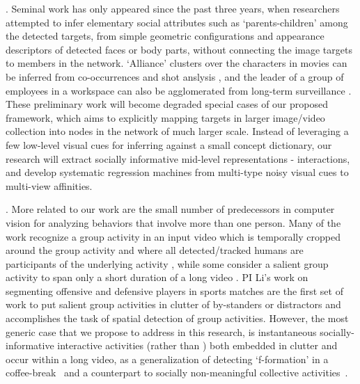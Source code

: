 . Seminal work has only appeared since the past three years, when researchers attempted to infer elementary social attributes such as `parents-children' among the detected targets, from simple geometric configurations and appearance descriptors of detected faces or body parts\cite{Gallagher,Wang2010,Murillo2012}, without connecting the image targets to members in the network. `Alliance' clusters over the characters in movies can be inferred from co-occurrences and shot anslysis \cite{Ding2010,Ding2011}, and the leader of a group of employees in a workspace can also be agglomerated from long-term surveillance \cite{Yu2009,Zhang2011}. These preliminary work will become degraded special cases of our proposed framework, which aims to explicitly mapping targets in larger image/video collection into nodes in the network of much larger scale. Instead of leveraging a few low-level visual cues for inferring against a small concept dictionary, our research will extract socially informative mid-level representations - interactions, and develop systematic regression machines from multi-type noisy visual cues to multi-view affinities.


. More related to our work are the small number of predecessors in computer vision for analyzing behaviors that involve more than one person. Many of the work recognize a group activity in an input video which is temporally cropped around the group activity and where all detected/tracked humans are participants of the underlying activity \cite{Intille:act,Ni:group,Lan:Group}, while some consider a salient group activity to span only a short duration of a long video \cite{Hongeng:act,Gong:act,Hakeem:act,Ba:meeting,McCowan:meeting,Choi:recogtrack,Vlad:group, Ryoo:group}. PI Li's work on segmenting offensive and defensive players in sports matches \cite{LiIJCV2012,Li2010} are the first set of work to put salient group activities in clutter of by-standers or distractors and accomplishes the task of spatial detection of group activities. However, the most generic case that we propose to address in this research, is instantaneous socially-informative interactive activities (rather than ) both embedded in clutter and occur within a long video, as a generalization of detecting `f-formation' in a coffee-break~\cite{Cristani:fformation} and a counterpart to socially non-meaningful collective activities~\cite{Amer:group}.


